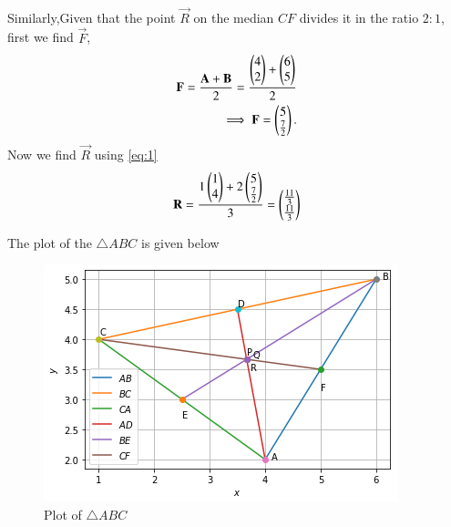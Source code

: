 \documentclass[journal,12pt,twocolumn]{IEEEtran}
\begin{document}
\begin{enumerate}[label=\alph*.]
\begin{align}
\end{align}
Similarly,Given that the point $\vec{R}$ on the median $CF$ divides it in the ratio $2:1$, first we find $\vec{F}$,
\begin{align}
    \mathbf{F} =\frac{\mathbf{A}+\mathbf{B}}{2} = \frac{\begin{pmatrix}4 \\ 2\end{pmatrix}+\begin{pmatrix}6 \\ 5\end{pmatrix}}{2}\\
    \implies \mathbf{F} = \begin{pmatrix}5 \\ \frac{7}{2}\end{pmatrix}.
\end{align}
Now we find $\vec{R}$ using \eqref{eq:1}
\begin{align}
   \mathbf{R}=\frac{1\begin{pmatrix}1\\4\end{pmatrix}+2\begin{pmatrix}5 \\ \frac{7}{2}\end{pmatrix}}{3}=\begin{pmatrix}\frac{11}{3} \\ \frac{11}{3}\end{pmatrix} 
\end{align}
\end{enumerate}
The plot of the $\triangle ABC$ is given below
\begin{figure}[ht]
    \centering
    \includegraphics[width=\columnwidth]{TriangleABC.PNG}
    \caption{Plot of $\triangle ABC$}
    \label{fig:$\triangle ABC$}
\end{figure}
\end{document}

